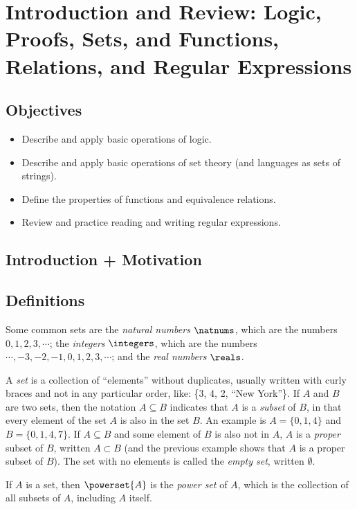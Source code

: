 \chapter{Introduction and Review: Logic, Proofs, Sets, and Functions, Relations, and Regular Expressions}

\section{Objectives}

\begin{itemize}
	\item Describe and apply basic operations of logic.
	\item Describe and apply basic operations of set theory (and languages as sets of strings).
	\item Define the properties of functions and equivalence relations.
	\item Review and practice reading and writing regular expressions.
\end{itemize}

\section{Introduction + Motivation}

\section{Definitions}

Some common sets are the \emph{natural numbers} $\natnums$, which are the numbers $0, 1, 2, 3, \cdots$; the \emph{integers} $\integers$, which are the numbers $\cdots, -3, -2, -1, 0, 1, 2, 3, \cdots$; and the \emph{real numbers} $\reals$.

A \emph{set} is a collection of ``elements'' without duplicates, usually written with curly braces and not in any particular order, like: \{3, 4, 2, ``New York''\}.
If $A$ and $B$ are two sets, then the notation $A \subseteq B$ indicates that $A$ is a \emph{subset} of $B$, in that every element of the set $A$ is also in the set $B$. An example is $A = \{0, 1, 4\}$ and $B = \{0, 1, 4, 7\}$.
If $A \subseteq B$ and some element of $B$ is also not in $A$, $A$ is a \emph{proper} subset of $B$, written $A \subset B$ (and the previous example shows that $A$ is a proper subset of $B$).
The set with no elements is called the \emph{empty set}, written $\emptyset$.

If $A$ is a set, then $\powerset{A}$ is the \emph{power set} of $A$, which is the collection of all subsets of $A$, including $A$ itself.

